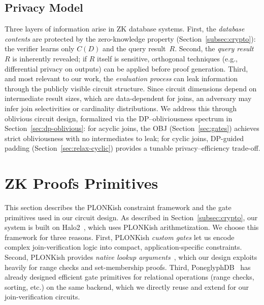 \documentclass[sigconf]{acmart}
\renewcommand{\emph}[1]{\textit{#1}}
\begin{document}
\subsection{Privacy Model}
\label{subsec:privacy}

Three layers of information arise in ZK database systems. First, the \emph{database contents} are protected by the zero-knowledge property (Section~\ref{subsec:crypto}): the verifier learns only $C(D)$ and the query result~$R$. Second, the \emph{query result}~$R$ is inherently revealed; if $R$ itself is sensitive, orthogonal techniques (e.g., differential privacy on outputs) can be applied before proof generation. Third, and most relevant to our work, the \emph{evaluation process} can leak information through the publicly visible circuit structure. Since circuit dimensions depend on intermediate result sizes, which are data-dependent for joins, an adversary may infer join selectivities or cardinality distributions. We address this through oblivious circuit design, formalized via the DP--obliviousness spectrum in Section~\ref{sec:dp-oblivious}: for acyclic joins, the OBJ (Section~\ref{sec:gates}) achieves strict obliviousness with no intermediates to leak; for cyclic joins, DP-guided padding (Section~\ref{sec:relax-cyclic}) provides a tunable privacy--efficiency trade-off.

\section{ZK Proofs Primitives}
\label{sec:ZKP}
This section describes the PLONKish constraint framework and the gate primitives used in our circuit design. As described in Section~\ref{subsec:crypto}, our system is built on Halo2~\cite{halo2}, which uses PLONKish arithmetization. We choose this framework for three reasons.
First, PLONKish \emph{custom gates} let us encode complex join-verification logic into compact, application-specific constraints. 
Second, PLONKish provides \emph{native lookup arguments}~\cite{gabizon2020plookup}, which our design exploits heavily for range checks and set-membership proofs.
Third, PoneglyphDB~\cite{gu2025poneglyphdb} has already designed efficient gate primitives for relational operations (range checks, sorting, etc.) on the same backend, which we directly reuse and extend for our join-verification circuits.
\end{document}
